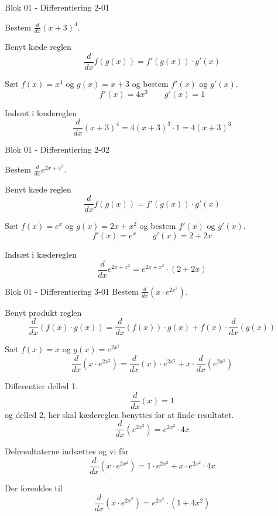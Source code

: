 \documentclass{article}
\begin{document}
\begin{exercise}{Blok 01 - Differentiering 2-01}

Bestem $\frac{d}{dx} (x + 3)^4$.


\hint
Benyt kæde reglen
\[
\frac{d}{dx} f(g(x)) = f'(g(x)) \cdot g'(x)
\]

\hint
Sæt $f(x) = x^4$ og $g(x) = x + 3$ og bestem $f'(x)$ og $g'(x)$.
\[
f'(x) = 4 x^3 \qquad g'(x) = 1
\]

\hint
Indsæt i kædereglen
\[
\frac{d}{dx} (x + 3)^4 = 4 (x + 3)^3 \cdot 1 = 4 (x + 3)^3
\]

\end{exercise}

\begin{exercise}{Blok 01 - Differentiering 2-02}

Bestem $\frac{d}{dx} e^{2x + x^2}$.


\hint
Benyt kæde reglen
\[
\frac{d}{dx} f(g(x)) = f'(g(x)) \cdot g'(x)
\]

\hint
Sæt $f(x) = e^x$ og $g(x) = 2x + x^2$ og bestem $f'(x)$ og $g'(x)$.
\[
f'(x) = e^x \qquad g'(x) = 2 + 2x
\]

\hint
Indsæt i kædereglen
\[
\frac{d}{dx} e^{2x + x^2} = e^{2x + x^2} \cdot (2 + 2x)
\]

\end{exercise}


\begin{exercise}{Blok 01 - Differentiering 3-01}
Bestem $\frac{d}{dx} \left( x \cdot e^{2x^2} \right)$.


\hint
Benyt produkt reglen
\[
\frac{d}{dx} \left( f(x) \cdot g(x) \right) = \frac{d}{dx} \left( f(x) \right) \cdot g(x) + f(x) \cdot \frac{d}{dx} \left( g(x) \right)
\]

\hint
Sæt $f(x) = x$ og $g(x) = e^{2x^2}$
\[
\frac{d}{dx} \left( x \cdot e^{2x^2} \right) = \frac{d}{dx} \left( x \right) \cdot e^{2x^2} + x \cdot \frac{d}{dx} \left( e^{2x^2} \right)
\]

\hint
Differentier delled 1.
\[
\frac{d}{dx} \left( x \right) = 1
\]
og delled 2, her skal kædereglen benyttes for at finde resultatet.
\[
\frac{d}{dx} \left( e^{2x^2} \right) = e^{2x^2} \cdot 4x
\]


\hint
Delresultaterne indsættes og vi får
\[
\frac{d}{dx} \left( x \cdot e^{2x^2} \right) = 1 \cdot e^{2x^2} + x \cdot e^{2x^2} \cdot 4x
\]

\hint
Der forenkles til
\[
\frac{d}{dx} \left( x \cdot e^{2x^2} \right) = e^{2x^2} \cdot (1 + 4x^2)
\]

\end{exercise}
\end{document}
